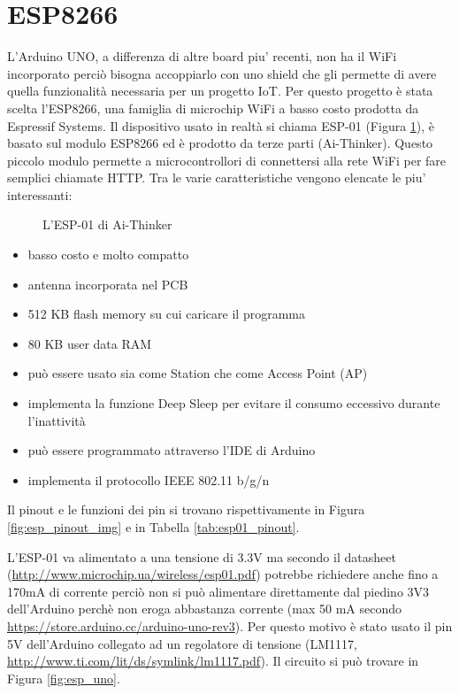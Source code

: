 \documentclass[12pt]{report}
\begin{document}
%
\section{ESP8266}\label{sec:esp8266}
%

L'Arduino UNO, a differenza di altre board piu' recenti, non ha il WiFi incorporato perciò bisogna accoppiarlo con uno shield che gli permette di avere quella funzionalità necessaria per un progetto IoT. Per questo progetto è stata scelta l'ESP8266, una famiglia di microchip WiFi a basso costo prodotta da Espressif Systems. Il dispositivo usato in realtà si chiama ESP-01 (Figura \ref{fig:esp01}), è basato sul modulo ESP8266 ed è prodotto da terze parti (Ai-Thinker). Questo piccolo modulo permette a microcontrollori di connettersi alla rete WiFi per fare semplici chiamate HTTP.
Tra le varie caratteristiche vengono elencate le piu' interessanti:

\begin{figure}
	\caption{L'ESP-01 di Ai-Thinker}
	\label{fig:esp01}
\end{figure}


\begin{itemize}
	\item basso costo e molto compatto
	\item antenna incorporata nel PCB
	\item 512 KB flash memory su cui caricare il programma
	\item 80 KB user data RAM
	\item può essere usato sia come Station che come Access Point (AP)
	\item implementa la funzione Deep Sleep per evitare il consumo eccessivo durante l'inattività
	\item può essere programmato attraverso l'IDE di Arduino
	\item implementa il protocollo IEEE 802.11 b/g/n
\end{itemize}
Il pinout e le funzioni dei pin si trovano rispettivamente in Figura \ref{fig:esp_pinout_img} e in Tabella \ref{tab:esp01_pinout}. 

L'ESP-01 va alimentato a una tensione di 3.3V ma secondo il datasheet (\url{http://www.microchip.ua/wireless/esp01.pdf}) potrebbe richiedere anche fino a 170mA di corrente perciò non si può alimentare direttamente dal piedino 3V3 dell'Arduino perchè non eroga abbastanza corrente (max 50 mA secondo \url{https://store.arduino.cc/arduino-uno-rev3}). Per questo motivo è stato usato il pin 5V dell'Arduino collegato ad un regolatore di tensione (LM1117, \url{http://www.ti.com/lit/ds/symlink/lm1117.pdf}). 
Il circuito si può trovare in Figura \ref{fig:esp_uno}.
\end{document}
